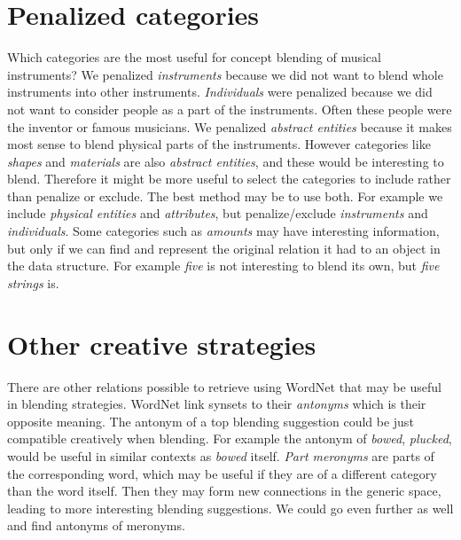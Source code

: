 


\section{Penalized categories}
Which categories are the most useful for concept blending of musical instruments? We penalized \emph{instruments} because we did not want to blend whole instruments into other instruments. \emph{Individuals} were penalized because we did not want to consider people as a part of the instruments. Often these people were the inventor or famous musicians. We penalized \emph{abstract entities} because it makes most sense to blend physical parts of the instruments. However categories like \emph{shapes} and \emph{materials} are also \emph{abstract entities}, and these would be interesting to blend. Therefore it might be more useful to select the categories to include rather than penalize or exclude. The best method may be to use both. For example we include \emph{physical entities} and \emph{attributes}, but penalize/exclude \emph{instruments} and \emph{individuals}. Some categories such as \emph{amounts} may have interesting information, but only if we can find and represent the original relation it had to an object in the data structure. For example \emph{five} is not interesting to blend its own, but \emph{five strings} is.


\section{Other creative strategies}
There are other relations possible to retrieve using WordNet that may be useful in blending strategies. WordNet link synsets to their \emph{antonyms} which is their opposite meaning. The antonym of a top blending suggestion could be just compatible creatively when blending. For example the antonym of \emph{bowed}, \emph{plucked}, would be useful in similar contexts as \emph{bowed} itself. \emph{Part meronyms} are parts of the corresponding word, which may be useful if they are of a different category than the word itself. Then they may form new connections in the generic space, leading to more interesting blending suggestions. We could go even further as well and find antonyms of meronyms.

